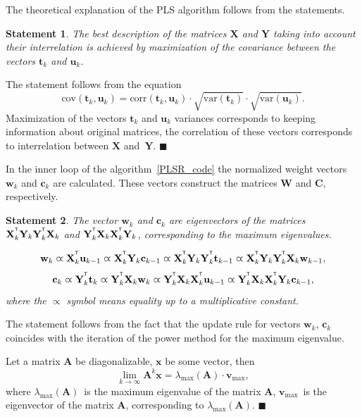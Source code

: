 \documentclass[preprint,12pt]{elsarticle}
\newtheorem{statement}{Statement}
\newcommand{\bx}{\mathbf{x}}
\newcommand{\bw}{\mathbf{w}}
\newcommand{\bY}{\mathbf{Y}}
\newcommand{\bX}{\mathbf{X}}
\newcommand{\bu}{\mathbf{u}}
\newcommand{\bt}{\mathbf{t}}
\newcommand{\bc}{\mathbf{c}}
\newcommand{\bC}{\mathbf{C}}
\newcommand{\bW}{\mathbf{W}}
\newcommand{\T}{^{\text{\tiny\sffamily\upshape\mdseries T}}}
\begin{document}
The theoretical explanation of the PLS algorithm follows from the statements.
\begin{statement}
	The best description of the matrices $\bX$ and $\bY$ taking into account their interrelation is achieved by maximization of the covariance between the vectors $\bt_k$ and $\bu_k$.
\end{statement}

The statement follows from the equation
\[
\text{cov} (\bt_k, \bu_k) = \text{corr} (\bt_k, \bu_k) \cdot \sqrt{\text{var}(\bt_k)} \cdot \sqrt{\text{var}(\bu_k)}.
\]
Maximization of the vectors $\bt_k$ and $\bu_k$ variances corresponds to keeping information about original matrices, the correlation of these vectors corresponds to interrelation between $\bX$ and~$\bY$. $\blacksquare$

In the inner loop of the algorithm~\ref{PLSR_code} the normalized weight vectors $\bw_k$ and $\bc_k$ are calculated. 
These vectors construct the matrices $\bW$ and $\bC$, respectively.

\begin{statement}
	The vector $\bw_k$ and $\bc_k$ are eigenvectors of the matrices $\bX_k^{\T} \bY_k \bY_k^{\T} \bX_k$ and $\bY_k^{\T} \bX_k \bX_k^{\T} \bY_k$, corresponding to the maximum eigenvalues.
	
	\begin{equation*}
	\bw_k \varpropto \bX_k^{\T} \bu_{k-1} \varpropto \bX_k^{\T} \bY_k \bc_{k-1} \varpropto \bX_k^{\T} \bY_k \bY_k^{\T} \bt_{k-1} \varpropto \bX_k^{\T} \bY_k \bY_k^{\T} \bX_k \bw_{k-1},
	\end{equation*}
	\begin{equation*}
	\bc_k \varpropto \bY_k^{\T} \bt_k \varpropto \bY_k^{\T} \bX_k \bw_k \varpropto \bY_k^{\T} \bX_k \bX_k^{\T} \bu_{k-1} \varpropto \bY_k^{\T} \bX_k \bX_k^{\T} \bY_k \bc_{k-1},
	\end{equation*}
	where the $\varpropto$ symbol means equality up to a multiplicative constant.
	\label{st::eig}
\end{statement}

The statement follows from the fact that the update rule for vectors $\bw_k$, $\bc_k$ coincides with the iteration of the power method for the maximum eigenvalue.

Let a matrix $\mathbf{A}$ be diagonalizable, $\bx$ be some vector, then
\[
\lim_{k \rightarrow \infty} \mathbf{A}^k \bx = \lambda_{\max}(\mathbf{A}) \cdot \mathbf{v}_{\max},
\]
where $ \lambda_{\max} (\mathbf{A})$~is the maximum eigenvalue of the matrix $\mathbf{A}$, $\mathbf{v}_{\max}$~is the eigenvector of the matrix $\mathbf{A}$, corresponding to $ \lambda_{\max} (\mathbf{A})$.
$\blacksquare$
\end{document}
